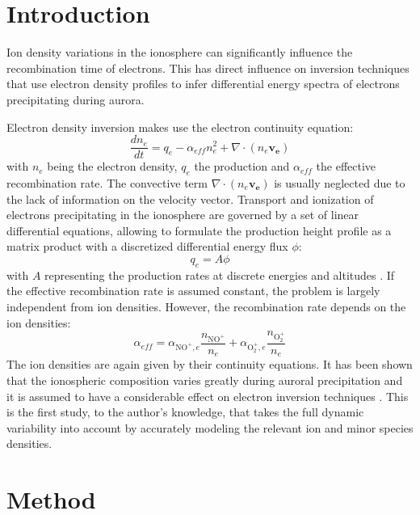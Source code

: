 \documentclass[10pt, a4paper]{article}
\numberwithin{equation}{section}										%
\begin{document}
\section{Introduction}
Ion density variations in the ionosphere can significantly influence the recombination time of electrons. This has direct influence on inversion techniques that use electron density profiles to infer differential energy spectra of electrons precipitating during aurora.

Electron density inversion makes use the electron continuity equation:
\begin{equation}
	\frac{dn_e}{dt} = q_e - \alpha_{eff} n_e^2 + \nabla \cdot (n_e \bm{v_{e}})
\end{equation}
with $n_e$ being the electron density, $q_e$ the production and $\alpha_{eff}$ the effective recombination rate. The convective term $\nabla \cdot (n_e \bm{v_e})$ is usually neglected due to the lack of information on the velocity vector.
Transport and ionization of electrons precipitating in the ionosphere are governed by a set of linear differential equations, allowing to formulate the production height profile as a matrix product with a discretized differential energy flux $\phi$:
\begin{equation}
	q_e = A \phi
\end{equation}
with $A$ representing the production rates at discrete energies and altitudes \cite{fang_parameterization_2010, semeter_determination_2005}. %
If the effective recombination rate is assumed constant, the problem is largely independent from ion densities. However, the recombination rate depends on the ion densities:
\begin{equation}
	\alpha_{eff} = \alpha_{\mathrm{NO^+}, e} \frac{n_{\mathrm{NO^+}}}{n_e} + \alpha_{\mathrm{O_2^+}, e} \frac{n_{\mathrm{O_2^+}}}{n_e}
\end{equation}
The ion densities are again given by their continuity equations. It has been shown that the ionospheric composition varies greatly during auroral precipitation \cite{jones_time_1973} and it is assumed to have a considerable effect on electron inversion techniques \cite{virtanen_electron_2018}. This is the first study, to the author's knowledge, that takes the full dynamic variability into account by accurately modeling the relevant ion and minor species densities.

\section{Method}
\end{document}
